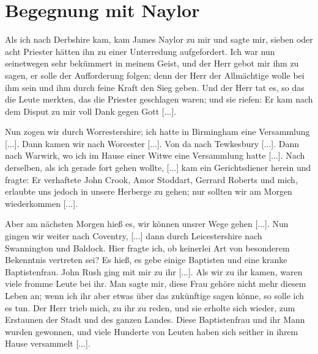\section{Begegnung mit Naylor}

Als ich nach Derbshire kam, kam James 
Naylor zu mir
und sagte mir, sieben oder acht Priester hätten ihn zu einer
Unterredung aufgefordert. Ich war nun seinetwegen sehr 
bekümmert in meinem Geist, und der Herr gebot mir ihm zu sagen,
er solle der Aufforderung folgen; denn der Herr der Allmächtige
wolle bei ihm sein und ihm durch feine Kraft den Sieg geben.
Und der Herr tat es, so das die Leute merkten, das die Priester
geschlagen waren; und sie riefen:  Er kam nach dem Disput zu
mir voll Dank gegen Gott [...].

Nun zogen wir durch Worrestershire; ich 
hatte in Birmingham eine Versammlung [...]. 
Dann kamen wir nach Worcester [...]. Von da 
nach Tewkesbury [...]. Dann nach Warwirk, 
wo ich im Hause einer Witwe eine Versammlung hatte [...].
Nach derselben, als ich gerade fort gehen wollte, [...] kam ein
Gerichtsdiener herein und fragte:  Er verhaftete John Crook, 
Amor Stoddart,
Gerrard Roberts und mich, erlaubte 
uns jedoch in unsere Herberge zu gehen; nur sollten wir am 
Morgen wiederkommen [...].


Aber am nächsten Morgen hieß es, wir können unsrer Wege
gehen [...]. Nun gingen wir weiter nach Coventry, [...]
dann durch Leicestershire nach 
Swannington und Baldock. Hier
fragte ich, ob keinerlei Art von besonderem Bekenntnis vertreten
sei? Es hieß, es gebe einige Baptisten und 
eine kranke Baptistenfrau. John 
Rush ging mit mir zu ihr [...]. Als wir zu
ihr kamen, waren viele fromme Leute bei ihr. Man sagte mir,
diese Frau gehöre nicht mehr diesem Leben an; wenn ich ihr aber
etwas über das zukünftige sagen könne, so solle ich es tun. Der
Herr trieb mich, zu ihr zu reden, und sie erholte sich wieder,
 zum Erstaunen der Stadt 
und des ganzen Landes. Diese 
Baptistenfrau und ihr Mann wurden gewonnen, und viele Hunderte
von Leuten haben sich seither in ihrem Hause versammelt [...].


